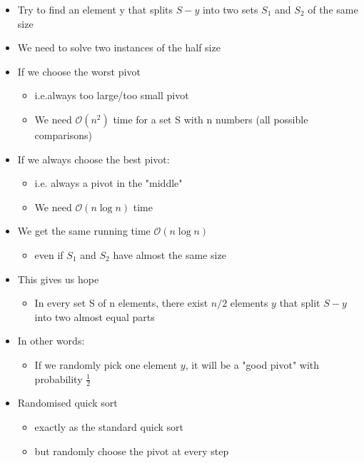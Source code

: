 \documentclass{article}[18pt]
\begin{document}
\begin{itemize}
	\item Try to find an element y that splits $S-y$ into two sets $S_1$ and $S_2$ of the same size
	\item We need to solve two instances of the half size
	\item If we choose the worst pivot
	\begin{itemize}
		\item i.e.always too large/too small pivot
		\item We need $\mathcal{O}(n^2)$ time for a set S with n numbers (all possible comparisons)
	\end{itemize}
	\item If we always choose the best pivot:
	\begin{itemize}
		\item i.e. always a pivot in the "middle"
		\item We need $\mathcal{O}(n\log n)$ time
	\end{itemize}
	\item We get the same running time $\mathcal{O}(n\log n)$
	\begin{itemize}
		\item even if $S_1$ and $S_2$ have almost the same size
	\end{itemize}
	\item This gives us hope
	\begin{itemize}
		\item In every set S of n elements, there exist $n/2$ elements $y$ that split $S-y$ into two almost equal parts
	\end{itemize}
	\item In other words:
	\begin{itemize}
		\item If we randomly pick one element $y$, it will be a "good pivot" with probability $\frac{1}{2}$
	\end{itemize}
	\item Randomised quick sort
	\begin{itemize}
		\item exactly as the standard quick sort
		\item but randomly choose the pivot at every step
	\end{itemize}
\end{itemize}
\end{document}
